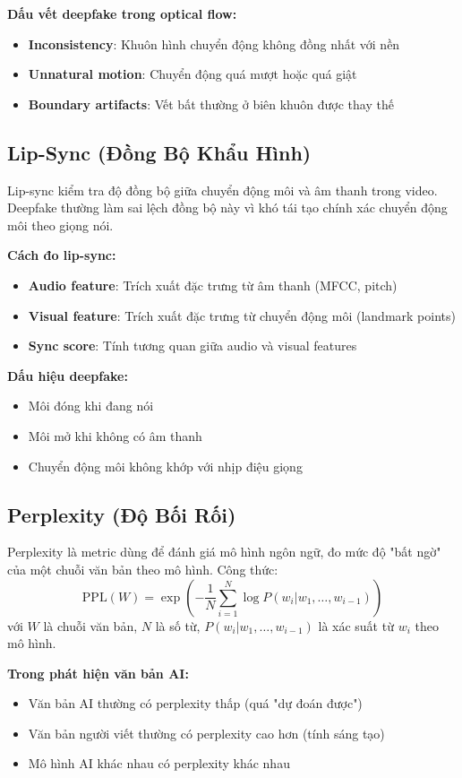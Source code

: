 \documentclass[14pt,a4paper,oneside]{report}
\begin{document}
\textbf{Dấu vết deepfake trong optical flow:}
\begin{itemize}
  \item \textbf{Inconsistency}: Khuôn hình chuyển động không đồng nhất với nền
  \item \textbf{Unnatural motion}: Chuyển động quá mượt hoặc quá giật
  \item \textbf{Boundary artifacts}: Vết bất thường ở biên khuôn được thay thế
\end{itemize}

\subsection{Lip-Sync (Đồng Bộ Khẩu Hình)}
Lip-sync kiểm tra độ đồng bộ giữa chuyển động môi và âm thanh trong video. Deepfake thường làm sai lệch đồng bộ này vì khó tái tạo chính xác chuyển động môi theo giọng nói.

\textbf{Cách đo lip-sync:}
\begin{itemize}
  \item \textbf{Audio feature}: Trích xuất đặc trưng từ âm thanh (MFCC, pitch)
  \item \textbf{Visual feature}: Trích xuất đặc trưng từ chuyển động môi (landmark points)
  \item \textbf{Sync score}: Tính tương quan giữa audio và visual features
\end{itemize}

\textbf{Dấu hiệu deepfake:}
\begin{itemize}
  \item Môi đóng khi đang nói
  \item Môi mở khi không có âm thanh
  \item Chuyển động môi không khớp với nhịp điệu giọng
\end{itemize}

\subsection{Perplexity (Độ Bối Rối)}
Perplexity là metric dùng để đánh giá mô hình ngôn ngữ, đo mức độ "bất ngờ" của một chuỗi văn bản theo mô hình. Công thức:
\[
\text{PPL}(W) = \exp\left(-\frac{1}{N}\sum_{i=1}^{N}\log P(w_i|w_1,\ldots,w_{i-1})\right)
\]
với $W$ là chuỗi văn bản, $N$ là số từ, $P(w_i|w_1,\ldots,w_{i-1})$ là xác suất từ $w_i$ theo mô hình.

\textbf{Trong phát hiện văn bản AI:}
\begin{itemize}
  \item Văn bản AI thường có perplexity thấp (quá "dự đoán được")
  \item Văn bản người viết thường có perplexity cao hơn (tính sáng tạo)
  \item Mô hình AI khác nhau có perplexity khác nhau
\end{itemize}
\end{document}
